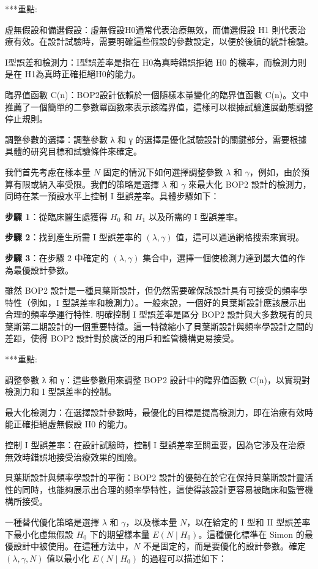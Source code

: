 ***重點:

虛無假設和備選假設：虛無假設H0通常代表治療無效，而備選假設 H1 則代表治療有效。在設計試驗時，需要明確這些假設的參數設定，以便於後續的統計檢驗。

I型誤差和檢測力：I型誤差率是指在 H0為真時錯誤拒絕 H0 的機率，而檢測力則是在 H1為真時正確拒絕H0的能力。

臨界值函數 C(n)：BOP2設計依賴於一個隨樣本量變化的臨界值函數 C(n)。文中推薦了一個簡單的二參數冪函數來表示該臨界值，這樣可以根據試驗進展動態調整停止規則。

調整參數的選擇：調整參數 λ 和 γ 的選擇是優化試驗設計的關鍵部分，需要根據具體的研究目標和試驗條件來確定。


我們首先考慮在樣本量 \( N \) 固定的情況下如何選擇調整參數 \( \lambda \) 和 \( \gamma \)，例如，由於預算有限或納入率受限。我們的策略是選擇 \( \lambda \) 和 \( \gamma \) 來最大化 BOP2 設計的檢測力，同時在某一預設水平上控制 I 型誤差率。具體步驟如下：

\textbf{步驟 1}：從臨床醫生處獲得 \( H_0 \) 和 \( H_1 \) 以及所需的 I 型誤差率。

\textbf{步驟 2}：找到產生所需 I 型誤差率的 \( (\lambda, \gamma) \) 值，這可以通過網格搜索來實現。

\textbf{步驟 3}：在步驟 2 中確定的 \( (\lambda, \gamma) \) 集合中，選擇一個使檢測力達到最大值的作為最優設計參數。

雖然 BOP2 設計是一種貝葉斯設計，但仍然需要確保該設計具有可接受的頻率學特性（例如，I 型誤差率和檢測力）。一般來說，一個好的貝葉斯設計應該展示出合理的頻率學運行特性\cite{source}. 明確控制 I 型誤差率是區分 BOP2 設計與大多數現有的貝葉斯第二期設計的一個重要特徵。這一特徵縮小了貝葉斯設計與頻率學設計之間的差距，使得 BOP2 設計對於廣泛的用戶和監管機構更易接受。


***重點:

調整參數 λ 和 γ：這些參數用來調整 BOP2 設計中的臨界值函數 C(n)，以實現對檢測力和 I 型誤差率的控制。

最大化檢測力：在選擇設計參數時，最優化的目標是提高檢測力，即在治療有效時能正確拒絕虛無假設 H0 的能力。

控制 I 型誤差率：在設計試驗時，控制 I 型誤差率至關重要，因為它涉及在治療無效時錯誤地接受治療效果的風險。

貝葉斯設計與頻率學設計的平衡：BOP2 設計的優勢在於它在保持貝葉斯設計靈活性的同時，也能夠展示出合理的頻率學特性，這使得該設計更容易被臨床和監管機構所接受。


一種替代優化策略是選擇 \( \lambda \) 和 \( \gamma \)，以及樣本量 \( N \)，以在給定的 I 型和 II 型誤差率下最小化虛無假設 \( H_0 \) 下的期望樣本量 \( E(N \mid H_0) \)。這種優化標準在 Simon 的最優設計中被使用。在這種方法中，\( N \) 不是固定的，而是要優化的設計參數。確定 \( (\lambda, \gamma, N) \) 值以最小化 \( E(N \mid H_0) \) 的過程可以描述如下：

